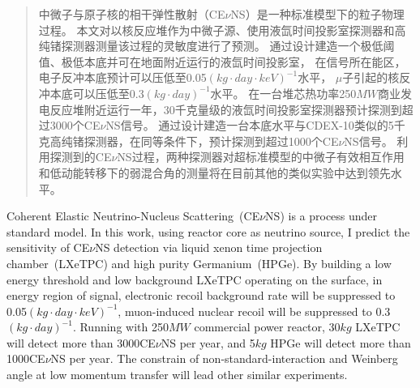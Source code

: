 

\begin{abstract}
  中微子与原子核的相干弹性散射（CE$\nu$NS）是一种标准模型下的粒子物理过程。
  本文对以核反应堆作为中微子源、使用液氙时间投影室探测器和高纯锗探测器测量该过程的灵敏度进行了预测。
  通过设计建造一个极低阈值、极低本底并可在地面附近运行的液氙时间投影室，
  在信号所在能区，电子反冲本底预计可以压低至0.05$\left(\si{kg}\cdot\si{day}\cdot\si{keV}\right)^{-1}$水平，
  $\mu$子引起的核反冲本底可以压低至0.3$\left(\si{kg}\cdot\si{day}\right)^{-1}$水平。
  在一台堆芯热功率250$\si{MW}$商业发电反应堆附近运行一年，30千克量级的液氙时间投影室探测器预计探测到超过3000个CE$\nu$NS信号。
  通过设计建造一台本底水平与CDEX-10类似的5千克高纯锗探测器，在同等条件下，预计探测到超过1000个CE$\nu$NS信号。
  利用探测到的CE$\nu$NS过程，两种探测器对超标准模型的中微子有效相互作用和低动能转移下的弱混合角的测量将在目前其他的类似实验中达到领先水平。

\end{abstract}

\begin{abstract*}
  Coherent Elastic Neutrino-Nucleus Scattering~(CE$\nu$NS) is a process under standard model.
  In this work, using reactor core as neutrino source, 
  I predict the sensitivity of CE$\nu$NS detection via liquid xenon time projection chamber~(LXeTPC) and high purity Germanium~(HPGe).
  By building a low energy threshold and low background LXeTPC operating on the surface,
  in energy region of signal, electronic recoil background rate will be suppressed to 0.05$\left(\si{kg}\cdot\si{day}\cdot\si{keV}\right)^{-1}$,
  muon-induced nuclear recoil will be suppressed to 0.3$\left(\si{kg}\cdot\si{day}\right)^{-1}$. 
  Running with 250$\si{MW}$ commercial power reactor, 30$\si{kg}$ LXeTPC will detect more than 3000CE$\nu$NS per year, 
  and 5$\si{kg}$ HPGe will detect more than 1000CE$\nu$NS per year. 
  The constrain of non-standard-interaction and Weinberg angle at low momentum transfer will lead other similar experiments.

\end{abstract*}
